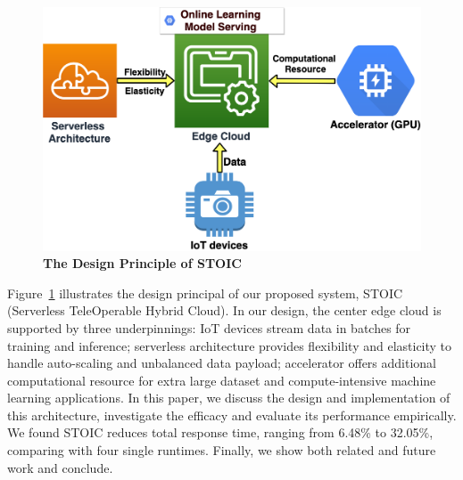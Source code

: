 \begin{figure}
    \centering
    \includegraphics[scale=0.25]{figures/edge}
    \caption{\textbf{The Design Principle of STOIC}}
    \label{fig:edge}
\end{figure}

Figure~\ref{fig:edge} illustrates the design principal of our proposed system, STOIC (Serverless TeleOperable Hybrid Cloud). In our design, the center edge cloud is supported by three underpinnings: IoT devices stream data in batches for training and inference; serverless architecture provides flexibility and elasticity to handle auto-scaling and unbalanced data payload; accelerator offers additional computational resource for extra large dataset and compute-intensive machine learning applications. In this paper, we discuss the design and implementation of this architecture, investigate the efficacy and evaluate its performance empirically. We found STOIC reduces total response time, ranging from 6.48\% to 32.05\%, comparing with four single runtimes. Finally, we show both related and future work and conclude.
